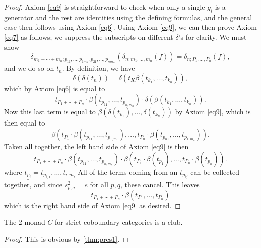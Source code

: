 \begin{proof}
Axiom \eqref{eq9} is straightforward to check when only a single $g_{i}$ is a generator and the rest are identities using the defining formulas, and the general case then follows using Axiom \eqref{eq6}. Using Axiom \eqref{eq9}, we can then prove Axiom \eqref{eq7} as follows; we suppress the subscripts on different $\delta$'s for clarity. We must show
  \[
    \delta_{m_1 + \cdots + m_n; p_{11}, \ldots, p_{1m_{1}}, p_{21}, \ldots, p_{nm_{m}}}\left( \delta_{n; m_{1}, \ldots, m_{n}}(f) \right) = \delta_{n; P_{1}, \ldots, P_{n}}(f),
  \]
and we do so on $t_{n}$. By definition, we have
  \[
    \delta \left( \delta(t_{n}) \right) = \delta \left( t_{K} \beta(t_{k_{1}}, \ldots, t_{k_{n}}) \right),
  \]
which by Axiom \eqref{eq6} is equal to
  \[
    t_{P_{1} + \cdots + P_{n}} \cdot \beta(t_{p_{11}}, \ldots, t_{p_{n,m_{n}}}) \cdot \delta\left( \beta(t_{k_{1}}, \ldots, t_{k_{n}}) \right).
  \]
Now this last term is equal to $\beta \left( \delta(t_{k_{1}}), \ldots, \delta(t_{k_{n}}) \right)$ by Axiom \eqref{eq9}, which is then equal to
  \[
    \beta \left( t_{P_{1}}\cdot \beta(t_{p_{11}}, \ldots, t_{p_{1,m_{1}}}), \ldots,  t_{P_{n}}\cdot \beta(t_{p_{n1}}, \ldots, t_{p_{1,m_{n}}}) \right).
  \]
Taken all together, the left hand side of Axiom \eqref{eq9} is then
  \[
    t_{P_{1} + \cdots + P_{n}} \cdot \beta(t_{p_{11}}, \ldots, t_{p_{n,m_{n}}}) \cdot \beta \left( t_{P_{1}}\cdot \beta(\underline{t_{p_{1}}}), \ldots,  t_{P_{n}}\cdot \beta(\underline{t_{p_{n}}}) \right).
  \]
where $\underline{t_{p_{i}}} = t_{p_{i,1}}, \ldots, t_{i,m_{i}}$
All of the terms coming from an $t_{p_{ij}}$ can be collected together, and since $s_{p,q}^{2} = e$ for all $p,q$, these cancel. This leaves
  \[
    t_{P_{1} + \cdots + P_{n}} \cdot \beta \left( t_{P_{1}}, \ldots,  t_{P_{n}} \right)
  \]
which is the right hand side of Axiom \eqref{eq9} as desired.
\end{proof}

\begin{lem}
The $2$-monad $C$ for strict coboundary categories is a club.
\end{lem}
\begin{proof}
This is obvious by \cref{thm:pres1}.
\end{proof}

